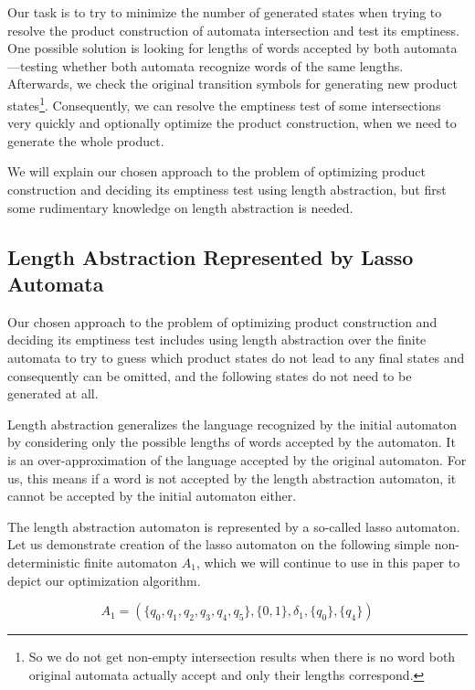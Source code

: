 Our task is to try to minimize the number of generated states when trying to resolve the product construction of automata intersection and test its emptiness. One possible solution is looking for lengths of words accepted by both automata---testing whether both automata recognize words of the same lengths. Afterwards, we check the original transition symbols for generating new product states\footnote{So we do not get non-empty intersection results when there is no word both original automata actually accept and only their lengths correspond.}. Consequently, we can resolve the emptiness test of some intersections very quickly and optionally optimize the product construction, when we need to generate the whole product.

We will explain our chosen approach to the problem of optimizing product construction and deciding its emptiness test using length abstraction, but first some rudimentary knowledge on length abstraction is needed.

\subsection{Length Abstraction Represented by Lasso Automata} \label{sec:length_abstraction}

Our chosen approach to the problem of optimizing product construction and deciding its emptiness test includes using length abstraction over the finite automata to try to guess which product states do not lead to any final states and consequently can be omitted, and the following states do not need to be generated at all.

Length abstraction generalizes the language recognized by the initial automaton by considering only the possible lengths of words accepted by the automaton. It is an over-approximation of the language accepted by the original automaton. For us, this means if a word is not accepted by the length abstraction automaton, it cannot be accepted by the initial automaton either.

The length abstraction automaton is represented by a so-called lasso automaton. Let us demonstrate creation of the lasso automaton on the following simple non-deterministic finite automaton $A_1$, which we will continue to use in this paper to depict our optimization algorithm.

$$ A_1 = (\{q_0, q_1, q_2, q_3, q_4, q_5\}, \{0, 1\}, \delta_1, \{q_0\}, \{q_4\}) $$

